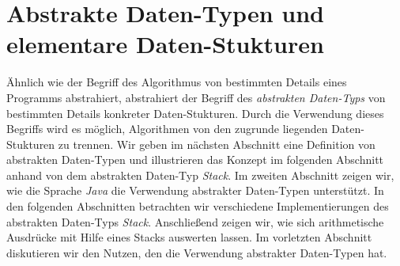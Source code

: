 \chapter{Abstrakte Daten-Typen und elementare Daten-Stukturen}
Ähnlich wie der Begriff des Algorithmus von bestimmten Details eines Programms
abstrahiert, abstrahiert der Begriff des \emph{abstrakten Daten-Typs} von bestimmten
Details konkreter Daten-Stukturen.  Durch die Verwendung dieses Begriffs wird es
m\"oglich, Algorithmen von den zugrunde liegenden Daten-Stukturen zu trennen.
Wir geben im n\"achsten Abschnitt eine Definition von abstrakten Daten-Typen und
illustrieren das Konzept im folgenden Abschnitt anhand von dem abstrakten Daten-Typ \textsl{Stack}.
Im zweiten Abschnitt zeigen wir, wie die Sprache \textsl{Java} die
Verwendung abstrakter Daten-Typen unterst\"utzt.  In den folgenden Abschnitten betrachten
wir verschiedene Implementierungen des abstrakten Daten-Typs \textsl{Stack}.
Anschlie{\ss}end zeigen wir, wie sich arithmetische Ausdr\"ucke mit Hilfe eines Stacks
auswerten lassen.
Im vorletzten Abschnitt diskutieren wir den Nutzen, den die Verwendung abstrakter
Daten-Typen hat. 

